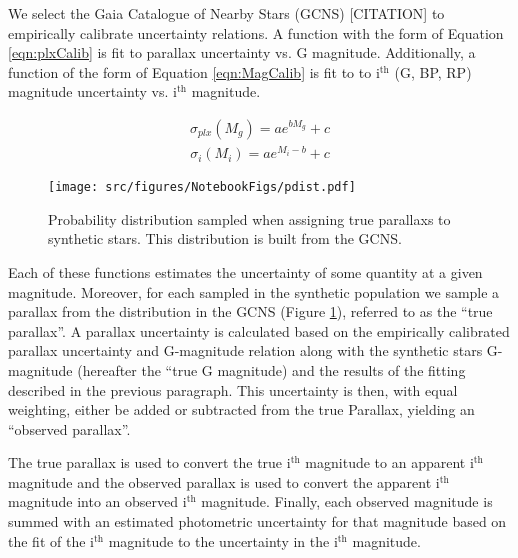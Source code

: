 We select the Gaia Catalogue of Nearby Stars (GCNS) {\color{red}[CITATION]} to
empirically calibrate uncertainty relations. A function with the form of
Equation \ref{eqn:plxCalib} is fit to parallax uncertainty vs. G magnitude.
Additionally, a function of the form of Equation \ref{eqn:MagCalib} is fit to
to i$^{\text{th}}$ (G, BP, RP) magnitude uncertainty vs. i$^{\text{th}}$
magnitude.

\begin{align}\label{eqn:plxCalib}
	\sigma_{plx}(M_{g}) = ae^{bM_{g}}+c
\end{align}
\begin{align}\label{eqn:MagCalib}
	\sigma_{i}(M_{i}) = ae^{M_{i}-b}+c
\end{align}

\begin{figure}
	\centering
	\texttt{[image: src/figures/NotebookFigs/pdist.pdf]}
	\caption{Probability distribution sampled when assigning true parallaxs to
	synthetic stars. This distribution is built from the GCNS.}
	\label{fig:pdist}
\end{figure}

Each of these functions estimates the uncertainty of some quantity at a given
magnitude. Moreover, for each sampled in the synthetic population we sample a
parallax from the distribution in the GCNS (Figure \ref{fig:pdist}), referred
to as the ``true parallax''. A parallax uncertainty is calculated based on the
empirically calibrated parallax uncertainty and G-magnitude relation along with
the synthetic stars G-magnitude (hereafter the ``true G magnitude) and the
results of the fitting described in the previous paragraph. This uncertainty
is then, with equal weighting, either be added or subtracted from the true
Parallax, yielding an ``observed parallax''.

The true parallax is used to convert the true i$^{\text{th}}$ magnitude to an
apparent i$^{\text{th}}$ magnitude and the observed parallax is used to convert
the apparent i$^{\text{th}}$ magnitude into an observed i$^{\text{th}}$
magnitude. Finally, each observed magnitude is summed with an estimated
photometric uncertainty for that magnitude based on the fit of the
i$^{\text{th}}$ magnitude to the uncertainty in the i$^{\text{th}}$ magnitude.

